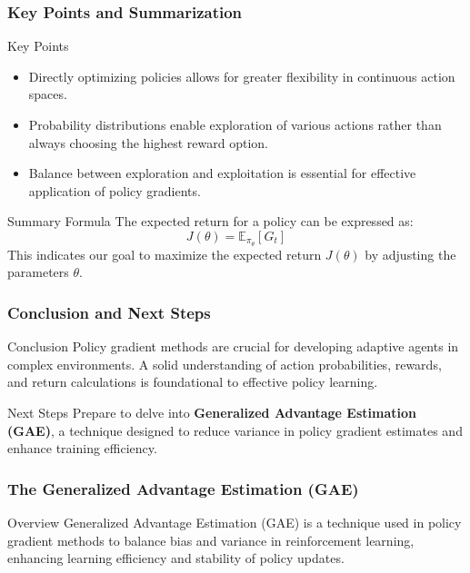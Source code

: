 \documentclass[aspectratio=169]{beamer}
\begin{document}
\begin{frame}[fragile]
    \frametitle{Key Points and Summarization}
    \begin{block}{Key Points}
        \begin{itemize}
            \item Directly optimizing policies allows for greater flexibility in continuous action spaces.
            \item Probability distributions enable exploration of various actions rather than always choosing the highest reward option.
            \item Balance between exploration and exploitation is essential for effective application of policy gradients.
        \end{itemize}
    \end{block}
    
    \begin{block}{Summary Formula}
        The expected return for a policy can be expressed as:
        \begin{equation}
            J(\theta) = \mathbb{E}_{\pi_\theta} [G_t]
        \end{equation}
        This indicates our goal to maximize the expected return \( J(\theta) \) by adjusting the parameters \( \theta \).
    \end{block}
\end{frame}

\begin{frame}[fragile]
    \frametitle{Conclusion and Next Steps}
    \begin{block}{Conclusion}
        Policy gradient methods are crucial for developing adaptive agents in complex environments. A solid understanding of action probabilities, rewards, and return calculations is foundational to effective policy learning.
    \end{block}

    \begin{block}{Next Steps}
        Prepare to delve into \textbf{Generalized Advantage Estimation (GAE)}, a technique designed to reduce variance in policy gradient estimates and enhance training efficiency.
    \end{block}
\end{frame}

\begin{frame}[fragile]
    \frametitle{The Generalized Advantage Estimation (GAE)}
    \begin{block}{Overview}
        Generalized Advantage Estimation (GAE) is a technique used in policy gradient methods to balance bias and variance in reinforcement learning, enhancing learning efficiency and stability of policy updates.
    \end{block}
\end{frame}
\end{document}

